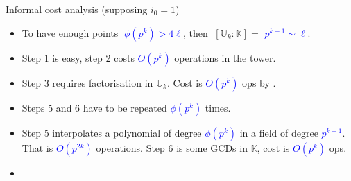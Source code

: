 \documentclass[10pt]{beamer}
\newcommand{\blue}[1]{\textcolor{blue}{#1}}  %
\newcommand{\K}{\mathbb{K}}  %
\newcommand{\U}{\mathbb{U}}  %
\newcommand{\euler}{\phi}  %
\newcommand{\0}{\mathcal{O}}  %
\begin{document}
\begin{frame}
  \begin{block}{\alert<2>{Informal} cost analysis (supposing $i_0 = 1$)}
    \begin{itemize}
    \item To have enough points \blue{$\;\euler(p^k) > 4\ell$}, then
      $\;[\U_k:\K] =$ \blue{$p^{k-1} \sim \ell$}.
    \item Step 1 is easy, step 2 costs \blue{$O(p^k)$}
      \alert<2>{operations in the tower}.
    \item \alert<1>{Step 3 requires factorisation in $\U_k$. Cost is
      \blue{$O(p^{k})$} \alert<2>{ops} by \cite{Couveignes00}.}
    \item Steps 5 and 6 have to be repeated
      \blue{$\euler(p^k)$} times.
    \item Step 5 interpolates a polynomial of degree
      \blue{$\euler(p^k)$} in a field of degree \blue{$p^{k-1}$}. That
      is \blue{$O(p^{2k})$} \alert<2>{operations}. Step 6 is some GCDs
      in $\K$, cost is \blue{$O(p^k)$} \alert<2>{ops}.
    \item {}
    \end{itemize}
  \end{block}
\end{frame}

\end{document}
